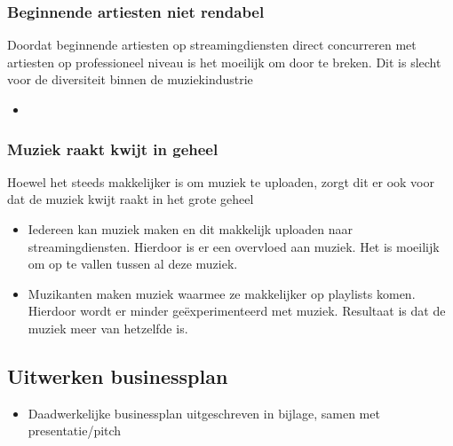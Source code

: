 \subsubsection*{Beginnende artiesten niet rendabel}
\begin{quotebox}
Doordat beginnende artiesten op streamingdiensten direct concurreren met artiesten op professioneel niveau is het moeilijk om door te breken. Dit is slecht voor de diversiteit binnen de muziekindustrie
\end{quotebox}
\begin{itemize}
  \item 
\end{itemize}

\subsubsection*{Muziek raakt kwijt in geheel}
\begin{quotebox}
Hoewel het steeds makkelijker is om muziek te uploaden, zorgt dit er ook voor dat de muziek kwijt raakt in het grote geheel
\end{quotebox}
\begin{itemize}
  \item Iedereen kan muziek maken en dit makkelijk uploaden naar streamingdiensten. Hierdoor is er een overvloed aan muziek. Het is moeilijk om op te vallen tussen al deze muziek.
  \item Muzikanten maken muziek waarmee ze makkelijker op playlists komen. Hierdoor wordt er minder geëxperimenteerd met muziek. Resultaat is dat de muziek meer van hetzelfde is.
\end{itemize}

\subsection {Uitwerken businessplan}

\begin{itemize}
  \item Daadwerkelijke businessplan uitgeschreven in bijlage, samen met presentatie/pitch
\end{itemize}
% 
